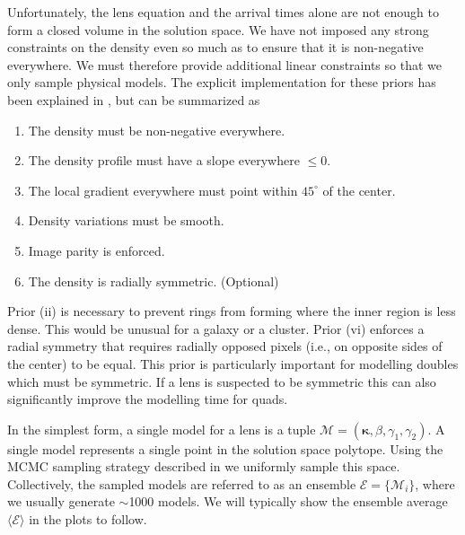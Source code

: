 \documentclass[galley,usenatbib]{mn2e}
\newcommand{\M}{\ensuremath{\mathscr{M}}}
\newcommand{\E}{\ensuremath{\mathscr{E}}}
\newcommand{\Eavg}{\ensuremath{\langle \E \rangle}}
\renewcommand{\vec}[1]{\ensuremath{\boldsymbol{#1}}}
\begin{document}
Unfortunately, the lens equation and the arrival times alone are not enough to form a
closed volume in the solution space. We have not imposed any strong constraints
on the density even so much as to ensure that it is non-negative everywhere. We
must therefore provide additional linear constraints so that we only sample
physical models. The explicit implementation for these priors has been
explained in \cite{2008ApJ...679...17C}, but can be summarized as
\begin{enumerate}
\item The density must be non-negative everywhere.
\item The density profile must have a slope everywhere $\le 0$.
\item The local gradient everywhere must point within $45^{\circ}$ of the center.
\item Density variations must be smooth.
\item Image parity is enforced.
\item The density is radially symmetric. (Optional)
\end{enumerate}

Prior (ii) is necessary to prevent rings from forming where the inner region is
less dense. This would be unusual for a galaxy or a cluster. Prior (vi)
enforces a radial symmetry that requires radially opposed pixels (i.e., on
opposite sides of the center) to be equal. This prior is particularly important
for modelling doubles which must be symmetric. If a lens is suspected to be
symmetric this can also significantly improve the modelling time for quads.

In the simplest form, a single model for a lens is a tuple $\M = (\vec\kappa,
\beta, \gamma_1, \gamma_2)$. A single model represents a single point in the
solution space polytope. Using the MCMC sampling strategy described in \cite{2012MNRAS.425.3077L}
we uniformly sample this space. Collectively, the sampled models are referred
to as an ensemble $\E = \{\M_i\}$, where we usually generate $\sim$1000 models. We
will typically show the ensemble average $\Eavg$ in the plots to
follow.
\end{document}
